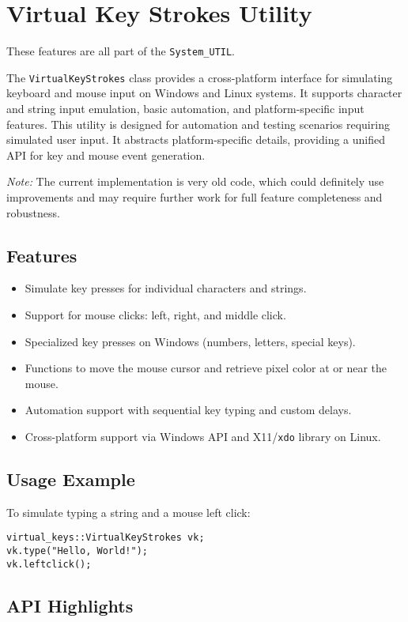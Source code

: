 \section{Virtual Key Strokes Utility}
\label{sec:virtualkeystrokes}

These features are all part of the \texttt{System\_UTIL}.


The \texttt{VirtualKeyStrokes} class provides a cross-platform interface for simulating keyboard and mouse input on Windows and Linux systems. It supports character and string input emulation, basic automation, and platform-specific input features. This utility is designed for automation and testing scenarios requiring simulated user input. It abstracts platform-specific details, providing a unified API for key and mouse event generation.

\textit{Note:} The current implementation is very old code, which could definitely use improvements and may require further work for full feature completeness and robustness.

\subsection{Features}
\begin{itemize}\itemsep0em
	\item Simulate key presses for individual characters and strings.
	\item Support for mouse clicks: left, right, and middle click.
	\item Specialized key presses on Windows (numbers, letters, special keys).
	\item Functions to move the mouse cursor and retrieve pixel color at or near the mouse.
	\item Automation support with sequential key typing and custom delays.
	\item Cross-platform support via Windows API and X11/\texttt{xdo} library on Linux.
\end{itemize}

\subsection{Usage Example}
To simulate typing a string and a mouse left click:
\begin{lstlisting}[style=cppstyle]
virtual_keys::VirtualKeyStrokes vk;
vk.type("Hello, World!");
vk.leftclick();
\end{lstlisting}

\subsection{API Highlights}

